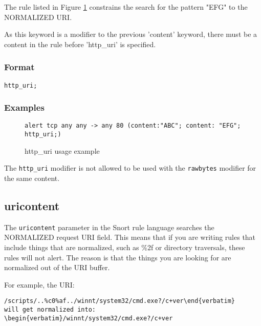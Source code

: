 \documentclass[english]{report}
\newenvironment{note}{
\samepage
    \vspace{10pt}{\textsf{
        {\hspace{7pt}\Huge{$\triangle$\hspace{-12.5pt}{\Large{$^!$}}}}\hspace{5pt}
        {\Large{NOTE}}
    }
    }
   \begin{center}
    \par\vspace{-17pt}

    \begin{lrbox}{\savepar}
    \begin{minipage}[r]{6in}
}
{
    \end{minipage}
    \end{lrbox}
    \fbox{
        \usebox{
            \savepar
	}
    }
    \par\vskip10pt
    \end{center}
}
\begin{document}
The rule listed in Figure \ref{fig:HttpUri} constrains the
search for the pattern "EFG" to the NORMALIZED URI.

As this keyword is a modifier to the previous 'content' keyword, there must be
a content in the rule before 'http\_uri' is specified.

\subsubsection{Format}

\begin{verbatim}
http_uri;
\end{verbatim}

\subsubsection{Examples}

\begin{figure}[!hbpt]
\begin{verbatim}
alert tcp any any -> any 80 (content:"ABC"; content: "EFG"; http_uri;)
\end{verbatim}
\caption{http\_uri usage example \label{fig:HttpUri}}
\end{figure}

\begin{note}
The \texttt{http\_uri} modifier is not allowed to be used with
the \texttt{rawbytes} modifier for the same content.
\end{note}

\subsection{uricontent\label{sub:UriContent}}

The \texttt{uricontent} parameter in the Snort rule language searches the
NORMALIZED request \textsc{URI} field.  This means that if you are writing
rules that include things that are normalized, such as \%2f or directory
traversals, these rules will not alert.  The reason is that the things you
are looking for are normalized out of the URI buffer.  

For example, the URI: 
\begin{verbatim}/scripts/..%c0%af../winnt/system32/cmd.exe?/c+ver\end{verbatim}
will get normalized into:
\begin{verbatim}/winnt/system32/cmd.exe?/c+ver\end{verbatim}
\end{document}
